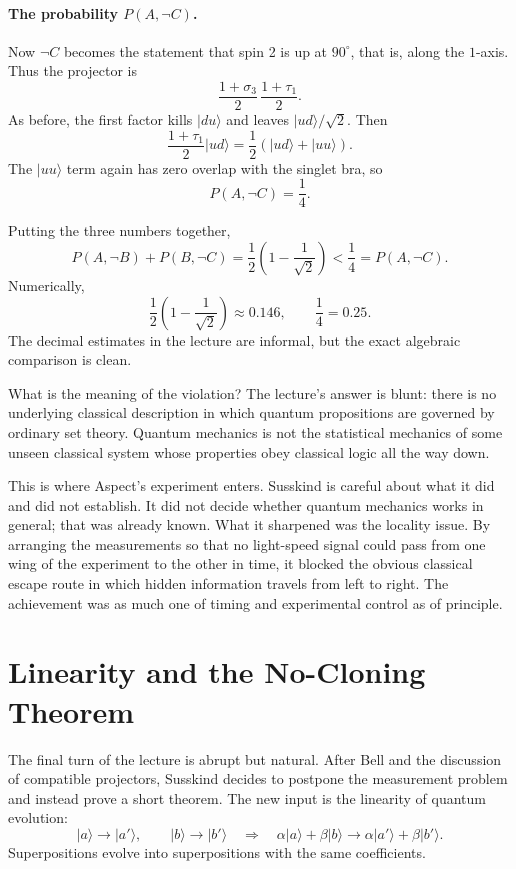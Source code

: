 \paragraph{The probability \(P(A,\neg C)\).}
Now \(\neg C\) becomes the statement that spin 2 is up at \(90^\circ\), that is, along the \(1\)-axis. Thus the projector is
\[
\frac{1+\sigma_3}{2}\,\frac{1+\tau_1}{2}.
\]
As before, the first factor kills \(|du\rangle\) and leaves \(|ud\rangle/\sqrt{2}\). Then
\begin{equation}
\frac{1+\tau_1}{2}|ud\rangle
=
\frac{1}{2}(|ud\rangle+|uu\rangle).
\end{equation}
The \(|uu\rangle\) term again has zero overlap with the singlet bra, so
\begin{equation}
P(A,\neg C)=\frac{1}{4}.
\end{equation}

Putting the three numbers together,
\begin{equation}
P(A,\neg B)+P(B,\neg C)
=
\frac{1}{2}\left(1-\frac{1}{\sqrt{2}}\right)
<
\frac{1}{4}
=
P(A,\neg C).
\end{equation}
Numerically,
\[
\frac{1}{2}\left(1-\frac{1}{\sqrt{2}}\right)\approx 0.146,
\qquad
\frac{1}{4}=0.25.
\]
The decimal estimates in the lecture are informal, but the exact algebraic comparison is clean.

What is the meaning of the violation? The lecture's answer is blunt: there is no underlying classical description in which quantum propositions are governed by ordinary set theory. Quantum mechanics is not the statistical mechanics of some unseen classical system whose properties obey classical logic all the way down.

This is where Aspect's experiment enters. Susskind is careful about what it did and did not establish. It did not decide whether quantum mechanics works in general; that was already known. What it sharpened was the locality issue. By arranging the measurements so that no light-speed signal could pass from one wing of the experiment to the other in time, it blocked the obvious classical escape route in which hidden information travels from left to right. The achievement was as much one of timing and experimental control as of principle.

\section{Linearity and the No-Cloning Theorem}

The final turn of the lecture is abrupt but natural. After Bell and the discussion of compatible projectors, Susskind decides to postpone the measurement problem and instead prove a short theorem. The new input is the linearity of quantum evolution:
\begin{equation}
|a\rangle\to |a'\rangle,
\qquad
|b\rangle\to |b'\rangle
\quad \Longrightarrow \quad
\alpha|a\rangle+\beta|b\rangle
\to
\alpha|a'\rangle+\beta|b'\rangle.
\end{equation}
Superpositions evolve into superpositions with the same coefficients.

